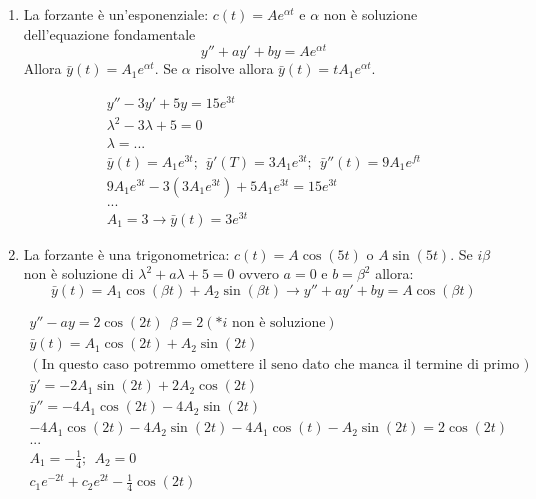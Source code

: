 \begin{enumerate}
    \item La forzante è un'esponenziale: $c(t)=Ae^{\alpha t}$ e $\alpha$ non è soluzione dell'equazione fondamentale
    \begin{equation*}
        y''+ay'+by=Ae^{\alpha t}
    \end{equation*}
    Allora $\bar{y}(t)=A_1e^{\alpha t}$. Se $\alpha$ risolve allora $\bar{y}(t)=tA_1e^{\alpha t}$.
    \begin{esempio}
        \begin{gather*}
            y''-3y'+5y=15e^{3t} \\
            \lambda^2 -3 \lambda+5 = 0\\
            \lambda = ... \\
            \bar{y}(t)=A_1e^{3t};\ \ \bar{y}'(T)=3A_1e^{3t};\ \ \bar{y}''(t)=9A_1e^{ft} \\
            9A_1e^{3t}-3(3A_1e^{3t})+5A_1e^{3t}=15e^{3t} \\
            ... \\
            A_1=3\longrightarrow \bar{y}(t)=3e^{3t}
        \end{gather*}
    \end{esempio}

    \item La forzante è una trigonometrica: $c(t)=A\cos(5t)$ o $A\sin(5t)$. Se $i\beta$ non è soluzione di $\lambda^2+a\lambda+5=0$ ovvero $a=0$ e $b=\beta^2$ allora:
    \begin{equation*}
        \bar{y}(t)=A_1\cos(\beta t)+A_2\sin(\beta t) \longrightarrow y''+ay'+by=A\cos(\beta t)
    \end{equation*}
    \begin{esempio}
        \begin{gather*}
            y''-ay=2\cos(2t)\ \ \beta = 2 (* i\text{ non è soluzione}) \\
            \bar{y}(t)=A_1\cos(2t)+A_2\sin(2t) \\
            (\text{In questo caso potremmo omettere il seno dato che manca il termine di primo grado}) \\
            \bar{y}'=-2A_1\sin(2t)+2A_2\cos(2t) \\
            \bar{y}''=-4A_1\cos(2t)-4A_2\sin(2t) \\
            -4A_1\cos(2t)-4A_2\sin(2t)-4A_1\cos(t)-A_2\sin(2t)=2\cos(2t) \\
            ... \\
            A_1 = -\frac14;\ \ A_2=0 \\
            c_1e^{-2t}+c_2e^{2t}- \frac{1}{4}\cos(2t)
        \end{gather*}
    \end{esempio}
\end{enumerate}

